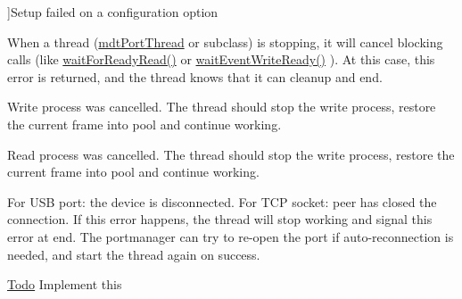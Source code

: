 \begin{Desc}
\begin{description}
{}]Setup failed on a configuration option \item[{\em 
\hypertarget{classmdt_abstract_port_ad4121bb930c95887e77f8bafa065a85ea14c0ddb478968710cb057a70406e4888}{
WaitingCanceled}
\label{classmdt_abstract_port_ad4121bb930c95887e77f8bafa065a85ea14c0ddb478968710cb057a70406e4888}
}]When a thread (\hyperlink{classmdt_port_thread}{mdtPortThread} or subclass) is stopping, it will cancel blocking calls (like \hyperlink{classmdt_abstract_port_aeda364cb191da1038a22dd1fc06a1d49}{waitForReadyRead()} or \hyperlink{classmdt_abstract_port_a35e4686f50e2c53c7e3618cf2c485d92}{waitEventWriteReady()} ). At this case, this error is returned, and the thread knows that it can cleanup and end. \item[{\em 
\hypertarget{classmdt_abstract_port_ad4121bb930c95887e77f8bafa065a85eae50ff4a9393507ad39005ddc7d5be42f}{
WriteCanceled}
\label{classmdt_abstract_port_ad4121bb930c95887e77f8bafa065a85eae50ff4a9393507ad39005ddc7d5be42f}
}]Write process was cancelled. The thread should stop the write process, restore the current frame into pool and continue working. \item[{\em 
\hypertarget{classmdt_abstract_port_ad4121bb930c95887e77f8bafa065a85eac910ca649b9eaa64e290be41945a61dc}{
ReadCanceled}
\label{classmdt_abstract_port_ad4121bb930c95887e77f8bafa065a85eac910ca649b9eaa64e290be41945a61dc}
}]Read process was cancelled. The thread should stop the write process, restore the current frame into pool and continue working. \item[{\em 
\hypertarget{classmdt_abstract_port_ad4121bb930c95887e77f8bafa065a85ea8b70726d03f75a691ac4ad65722a5f3c}{
Disconnected}
\label{classmdt_abstract_port_ad4121bb930c95887e77f8bafa065a85ea8b70726d03f75a691ac4ad65722a5f3c}
}]For USB port: the device is disconnected. For TCP socket: peer has closed the connection. If this error happens, the thread will stop working and signal this error at end. The portmanager can try to re-\/open the port if auto-\/reconnection is needed, and start the thread again on success.\begin{Desc}
\item[\hyperlink{todo__todo000018}{Todo}]Implement this 


\end{Desc}
\end{description}
\end{Desc}
